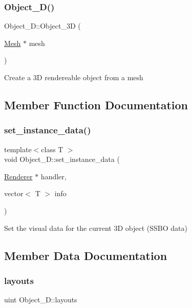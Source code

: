 \subsubsection{\texorpdfstring{Object\+\_\+D()}{Object\_3D()}}
{\footnotesize\ttfamily Object\+\_\+D\+::\+Object\+\_\+3D (\begin{DoxyParamCaption}\item[{\mbox{\hyperlink{structMesh}{Mesh}} $\ast$}]{mesh }\end{DoxyParamCaption})}

Create a 3D rendereable object from a mesh 

\subsection{Member Function Documentation}
\mbox{\label{classObject__3D_acde5ca17a5d5806291c8235e20302733}} 
\subsubsection{\texorpdfstring{set\+\_\+instance\+\_\+data()}{set\_instance\_data()}}
{\footnotesize\ttfamily template$<$class T $>$ \\
void Object\+\_\+D\+::set\+\_\+instance\+\_\+data (\begin{DoxyParamCaption}\item[{\mbox{\hyperlink{classRenderer}{Renderer}} $\ast$}]{handler,  }\item[{vector$<$ T $>$}]{info }\end{DoxyParamCaption})}

Set the visual data for the current 3D object (S\+S\+BO data) 

\subsection{Member Data Documentation}
\mbox{\label{classObject__3D_a8d3d45ffb70d9725a4907d23d0f73d62}} 
\subsubsection{\texorpdfstring{layouts}{layouts}}
{\footnotesize\ttfamily uint Object\+\_\+D\+::layouts}




